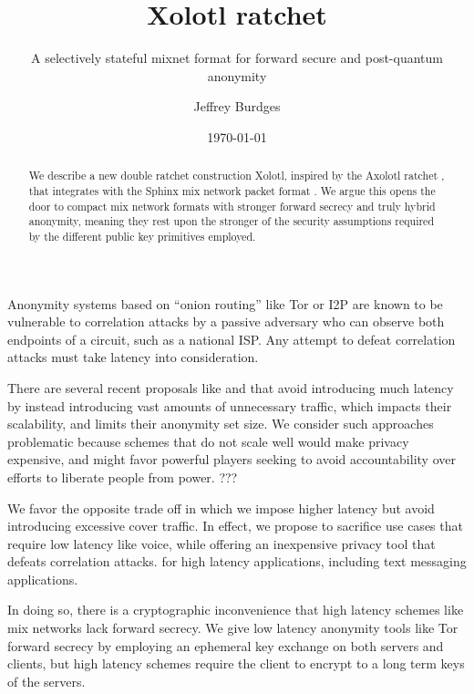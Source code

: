 \documentclass[twoside,letterpaper]{llncs}
\title{Xolotl ratchet}
\subtitle{A selectively stateful mixnet format for forward secure and post-quantum anonymity}
\author{Jeffrey Burdges}
\date{\today}
\begin{document}
\maketitle



\begin{abstract}
We describe a new double ratchet construction Xolotl,
 inspired by the Axolotl ratchet \cite{Axolotl},
that integrates with the Sphinx mix network packet format \cite{Sphinx}.
We argue this opens the door to compact mix network formats with
stronger forward secrecy and truly hybrid anonymity, meaning they
rest upon the stronger of the security assumptions required by
 the different public key primitives employed.
\end{abstract}



Anonymity systems based on ``onion routing'' \cite{??OR??}
like Tor or I2P are known to be vulnerable to correlation attacks by
a passive adversary who can observe both endpoints of a circuit, such
as a national ISP.   Any attempt to defeat correlation attacks must
take latency into consideration. 

There are several recent proposals like \cite{Alpenhorn??} and
\cite{Dissent??} that avoid introducing much latency by instead
introducing vast amounts of unnecessary traffic, which impacts their
scalability, and limits their anonymity set size.  We consider such
approaches problematic because schemes that do not scale well would
make privacy expensive, and might favor powerful players seeking to
avoid accountability over efforts to liberate people from power. ???

We favor the opposite trade off in which we impose higher latency but
avoid introducing excessive cover traffic. In effect, we propose to
sacrifice use cases that require low latency like voice, while
offering an inexpensive privacy tool that defeats correlation attacks.
for high latency applications, including text messaging applications.

In doing so, there is a cryptographic inconvenience that high latency
schemes like mix networks lack forward secrecy.  We give low latency
anonymity tools like Tor forward secrecy by employing an ephemeral
key exchange on both servers and clients, but high latency schemes
require the client to encrypt to a long term keys of the servers.
\end{document}
